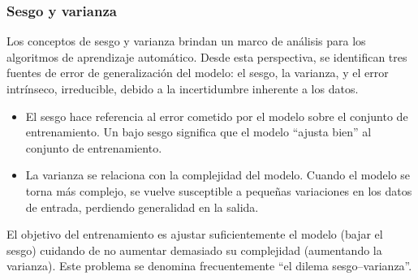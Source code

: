 %
\subsubsection{Sesgo y varianza}
%
Los conceptos de sesgo y varianza brindan un marco de análisis para
los algoritmos de aprendizaje automático.
Desde esta perspectiva, se
identifican tres fuentes de error de generalización del modelo: el
sesgo, la varianza, y el error intrínseco, irreducible, debido a la
incertidumbre inherente a los datos.
%
\begin{itemize}
\item El sesgo hace referencia al error cometido por el modelo sobre
  el conjunto de entrenamiento. Un bajo sesgo significa que el modelo
  ``ajusta bien'' al conjunto de entrenamiento.
\item La varianza se relaciona con la complejidad del modelo. Cuando
  el modelo se torna más complejo, se vuelve susceptible a pequeñas
  variaciones en los datos de entrada, perdiendo generalidad en la
  salida.
\end{itemize}
%
El objetivo del entrenamiento es ajustar suficientemente el modelo
(bajar el sesgo) cuidando de no aumentar demasiado su complejidad
(aumentando la varianza).  Este problema se denomina frecuentemente
``el dilema sesgo--varianza''.







